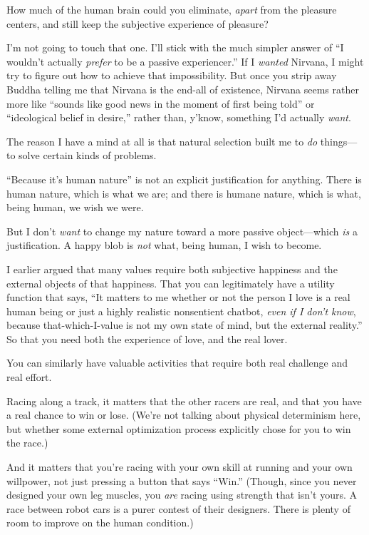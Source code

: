  How much of the human brain could you eliminate, \textit{apart}
from the pleasure centers, and still keep the subjective experience of
pleasure?


 I'm not going to touch that one.
I'll stick with the much simpler answer of
``I wouldn't actually \textit{prefer}
to be a passive experiencer.'' If I \textit{wanted}
Nirvana, I might try to figure out how to achieve that impossibility.
But once you strip away Buddha telling me that Nirvana is the end-all
of existence, Nirvana seems rather more like ``sounds
like good news in the moment of first being told'' or
``ideological belief in desire,''
rather than, y'know, something I'd
actually \textit{want}.


 The reason I have a mind at all is that natural selection built me
to \textit{do} things---to solve certain kinds of problems.


 ``Because it's human
nature'' is not an explicit justification for
anything. There is human nature, which is what we are; and there is
humane nature, which is what, being human, we wish we were.


 But I don't \textit{want} to change my nature
toward a more passive object---which \textit{is} a justification. A
happy blob is \textit{not} what, being human, I wish to become.


 I earlier argued that many values require both subjective
happiness and the external objects of that happiness. That you can
legitimately have a utility function that says, ``It
matters to me whether or not the person I love is a real human being or
just a highly realistic nonsentient chatbot, \textit{even if I
don't know}, because that-which-I-value is not my own
state of mind, but the external reality.'' So that
you need both the experience of love, and the real lover.


 You can similarly have valuable activities that require both real
challenge and real effort.


 Racing along a track, it matters that the other racers are real,
and that you have a real chance to win or lose. (We're
not talking about physical determinism here, but whether some external
optimization process explicitly chose for you to win the race.)


 And it matters that you're racing with your own
skill at running and your own willpower, not just pressing a button
that says ``Win.'' (Though, since
you never designed your own leg muscles, you \textit{are} racing using
strength that isn't yours. A race between robot cars is
a purer contest of their designers. There is plenty of room to improve
on the human condition.)


